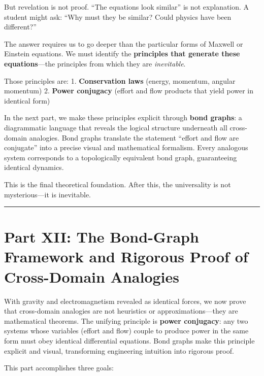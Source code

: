 \documentclass[
]{article}
\begin{document}
But revelation is not proof. ``The equations look similar'' is not
explanation. A student might ask: ``Why must they be similar? Could
physics have been different?''

The answer requires us to go deeper than the particular forms of Maxwell
or Einstein equations. We must identify the \textbf{principles that
generate these equations}---the principles from which they are
\emph{inevitable}.

Those principles are: 1. \textbf{Conservation laws} (energy, momentum,
angular momentum) 2. \textbf{Power conjugacy} (effort and flow products
that yield power in identical form)

In the next part, we make these principles explicit through \textbf{bond
graphs}: a diagrammatic language that reveals the logical structure
underneath all cross-domain analogies. Bond graphs translate the
statement ``effort and flow are conjugate'' into a precise visual and
mathematical formalism. Every analogous system corresponds to a
topologically equivalent bond graph, guaranteeing identical dynamics.

This is the final theoretical foundation. After this, the universality
is not mysterious---it is inevitable.

\begin{center}\rule{0.5\linewidth}{0.5pt}\end{center}

\section{Part XII: The Bond-Graph Framework and Rigorous Proof of
Cross-Domain
Analogies}\label{part-xii-the-bond-graph-framework-and-rigorous-proof-of-cross-domain-analogies}

With gravity and electromagnetism revealed as identical forces, we now
prove that cross-domain analogies are not heuristics or
approximations---they are mathematical theorems. The unifying principle
is \textbf{power conjugacy}: any two systems whose variables (effort and
flow) couple to produce power in the same form must obey identical
differential equations. Bond graphs make this principle explicit and
visual, transforming engineering intuition into rigorous proof.

This part accomplishes three goals:
\end{document}
